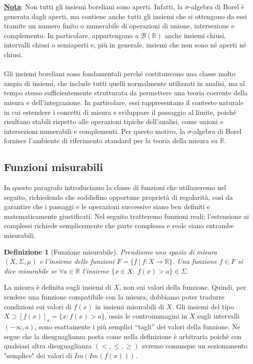 \documentclass[a4paper,12pt]{report}
\newtheorem{definizione}{Definizione}[chapter]
\newcommand{\lt}{<}
\newcommand{\gt}{>}
\begin{document}
\underline{\textbf{Nota}}: Non tutti gli insiemi boreliani sono aperti. Infatti, la $\sigma$-algebra di Borel è generata dagli aperti, ma contiene anche tutti gli insiemi che si ottengono da essi tramite un numero finito o numerabile di operazioni di unione, intersezione e complemento. In particolare, appartengono a $\mathcal{B}(\mathbb{R})$ anche insiemi chiusi, intervalli chiusi o semiaperti e, più in generale, insiemi che non sono né aperti né chiusi.
\\
\\Gli insiemi boreliani sono fondamentali perché costituiscono una classe molto ampia di insiemi, che include tutti quelli normalmente utilizzati in analisi, ma al tempo stesso sufficientemente strutturata da permettere una teoria coerente della misura e dell’integrazione. In particolare, essi rappresentano il contesto naturale in cui estendere i concetti di misura e sviluppare il passaggio al limite, poiché risultano stabili rispetto alle operazioni tipiche dell’analisi, come unioni e intersezioni numerabili e complementi. Per questo motivo, la $\sigma$-algebra di Borel fornisce l’ambiente di riferimento standard per la teoria della misura su $\mathbb{R}$.

\subsection{Funzioni misurabili}\label{sec: 3.1.2}

In questo paragrafo introduciamo la classe di funzioni che utilizzeremo nel seguito, richiedendo che soddisfino opportune proprietà di regolarità, così da garantire che i passaggi e le operazioni successive siano ben definiti e matematicamente giustificati. Nel seguito tratteremo funzioni reali; l'estensione ai complessi richiede semplicemente che parte complessa e reale siano entrambe misurabili.

\begin{definizione}[Funzione misurabile]\label{def: 3.8}
    Prendiamo uno spazio di misura $(X,\Sigma, \mu)$ e l'insieme delle funzioni $F=\{f\ | \ f:X\to \mathbb{R}\}$. Una funzione $f\in F$ si dice misurabile se $\forall a \in \mathbb{R}$ l'insieme $ \{x \in X: \ f(x) \gt a\}\in \Sigma$.
\end{definizione}

La misura è definita sugli insiemi di $X$, non sui valori della funzione.
Quindi, per rendere una funzione compatibile con la misura, dobbiamo poter tradurre condizioni sui valori di $f(x)$ in insiemi misurabili di $X$. Gli insiemi del tipo \mbox{$X \supset [f(x)]_a=\{x: f(x) \gt a\}$}, ossia le controimmagini in $X$ sugli intervalli $(-\infty,a)$, sono esattamente i più semplici “tagli” dei valori della funzione. Ne segue che la disuguaglianza posta come nella definizione è arbitraria poichè con qualsiasi altra disuguaglianza $(\lt, \leq, \geq)$ avremo comunque un sezionamento "semplice" dei valori di $Im(Im(f(x)))$.
\end{document}
